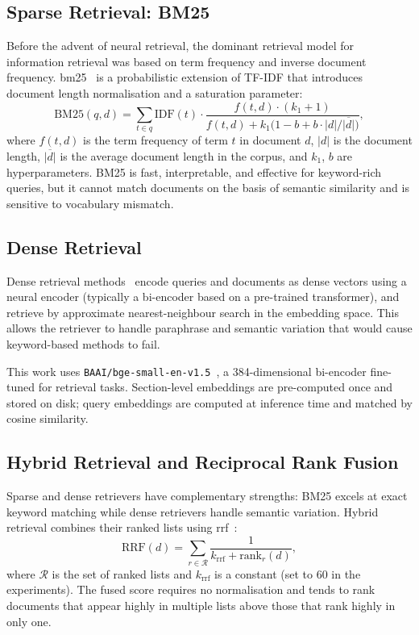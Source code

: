 \subsection{Sparse Retrieval: BM25}

Before the advent of neural retrieval, the dominant retrieval model for information
retrieval was based on term frequency and inverse document frequency.
\gls{bm25}~\cite{robertson2009bm25} is a probabilistic extension of TF-IDF that
introduces document length normalisation and a saturation parameter:
\begin{equation}
    \mathrm{BM25}(q, d) = \sum_{t \in q}
        \mathrm{IDF}(t) \cdot
        \frac{f(t,d) \cdot (k_1 + 1)}
             {f(t,d) + k_1 \bigl(1 - b + b \cdot |d| / \overline{|d|}\bigr)},
\end{equation}
where $f(t, d)$ is the term frequency of term $t$ in document $d$, $|d|$ is the
document length, $\overline{|d|}$ is the average document length in the corpus,
and $k_1$, $b$ are hyperparameters.
BM25 is fast, interpretable, and effective for keyword-rich queries, but it cannot
match documents on the basis of semantic similarity and is sensitive to vocabulary
mismatch.

\subsection{Dense Retrieval}

Dense retrieval methods~\cite{karpukhin2020dpr} encode queries and documents as
dense vectors using a neural encoder (typically a bi-encoder based on a pre-trained
transformer), and retrieve by approximate nearest-neighbour search in the embedding
space. This allows the retriever to handle paraphrase and semantic variation that
would cause keyword-based methods to fail.

This work uses \texttt{BAAI/bge-small-en-v1.5}~\cite{bge2023}, a 384-dimensional
bi-encoder fine-tuned for retrieval tasks. Section-level embeddings are pre-computed
once and stored on disk; query embeddings are computed at inference time and matched
by cosine similarity.

\subsection{Hybrid Retrieval and Reciprocal Rank Fusion}

Sparse and dense retrievers have complementary strengths: BM25 excels at exact
keyword matching while dense retrievers handle semantic variation. Hybrid retrieval
combines their ranked lists using \gls{rrf}~\cite{cormack2009rrf}:
\begin{equation}
    \mathrm{RRF}(d) = \sum_{r \in \mathcal{R}}
        \frac{1}{k_{\mathrm{rrf}} + \mathrm{rank}_r(d)},
\end{equation}
where $\mathcal{R}$ is the set of ranked lists and $k_{\mathrm{rrf}}$ is a constant
(set to $60$ in the experiments). The fused score requires no normalisation and
tends to rank documents that appear highly in multiple lists above those that rank
highly in only one.

